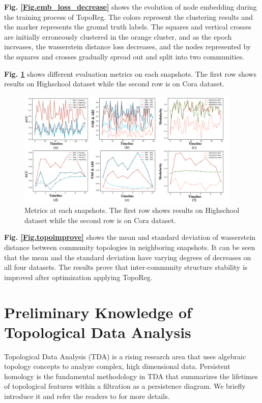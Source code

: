 \documentclass[letterpaper]{article} %
\begin{document}
\noindent\textbf{Fig. \ref{Fig.emb_loss_decrease}} shows the evolution of node embedding during the training process of TopoReg. The colors represent the clustering results and the marker represents the ground truth labels. The squares and vertical crosses are initially erroneously clustered in the orange cluster, and as the epoch increases, the wasserstein distance loss decreases, and the nodes represented by the squares and crosses gradually spread out and split into two communities.

\noindent\textbf{Fig. \ref{Fig.metrics}} shows different evaluation metrics on each snapshots. The first row shows results on Highschool dataset while the second row is on Cora dataset. 
\begin{figure}[]
\centering %
\includegraphics[width=0.95\textwidth]{pic/metrics.pdf} %
\caption{Metrics at each snapshots. The first row shows results on Highschool dataset while the second row is on Cora dataset.} %
\label{Fig.metrics} %
\end{figure}

\noindent\textbf{Fig. \ref{Fig.topoimprove}} shows the mean and standard deviation of wasserstein distance between community topologies in neighboring snapshots. It can be seen that the mean and the standard deviation have varying degrees of decreases on all four datasets. The results prove that inter-community structure stability is improved after optimization applying TopoReg.


\section{Preliminary Knowledge of Topological Data Analysis}

Topological Data Analysis (TDA) is a rising research area that uses algebraic topology concepts to analyze complex, high dimensional data. Persistent homology is the fundamental methodology in TDA that summarizes the lifetimes of topological features within a filtration as a persistence diagram. We briefly introduce it and refer the readers to \cite{dey2022computational} for more details.
\end{document}
